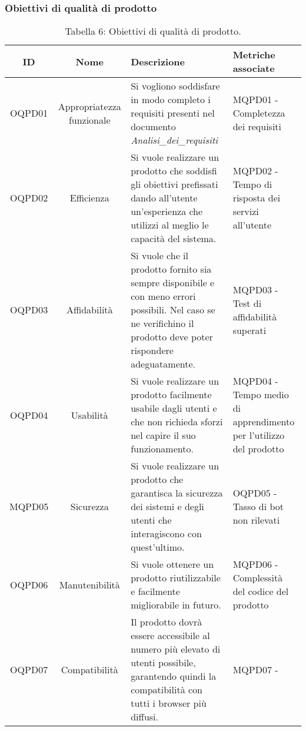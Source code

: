 \subsubsection{Obiettivi di qualità di prodotto}
\begin{table}[H]
	\centering
	\begin{tabularx}{\textwidth}{|c|c|X|X|}
		\hline
		\textbf{ID} & \textbf{Nome} & \textbf{Descrizione} & \textbf{Metriche associate}\\
		\hline
		OQPD01 & Appropriatezza funzionale & Si vogliono soddisfare in modo completo i requisiti presenti nel documento \textit{Analisi\_dei\_requisiti} & MQPD01 - Completezza dei requisiti \\
		\hline
		OQPD02 & Efficienza & Si vuole realizzare un prodotto che soddisfi gli obiettivi prefissati dando all'utente un'esperienza che utilizzi al meglio le capacità del sistema. & MQPD02 - Tempo di risposta dei servizi all'utente\\
		\hline
		OQPD03 & Affidabilità & Si vuole che il prodotto fornito sia sempre disponibile e con meno errori possibili. Nel caso se ne verifichino il prodotto deve poter rispondere adeguatamente. & MQPD03 - Test di affidabilità superati\\
		\hline
		OQPD04 & Usabilità & Si vuole realizzare un prodotto facilmente usabile dagli utenti e che non richieda sforzi nel capire il suo funzionamento. & MQPD04 - Tempo medio di apprendimento per l'utilizzo del prodotto\\
		\hline
		MQPD05 & Sicurezza & Si vuole realizzare un prodotto che garantisca la sicurezza dei sistemi e degli utenti che interagiscono con quest'ultimo. & OQPD05 - Tasso di bot non rilevati\\
		\hline
		OQPD06 & Manutenibilità & Si vuole ottenere un prodotto riutilizzabile e facilmente migliorabile in futuro. & MQPD06 - Complessità del codice del prodotto\\
		\hline
		OQPD07 & Compatibilità & Il prodotto dovrà essere accessibile al numero più elevato di utenti possibile, garantendo quindi la compatibilità con tutti i browser più diffusi. & MQPD07 -\\
		\hline
	\end{tabularx}
	\caption{Tabella 6: Obiettivi di qualità di prodotto.}
\end{table}

